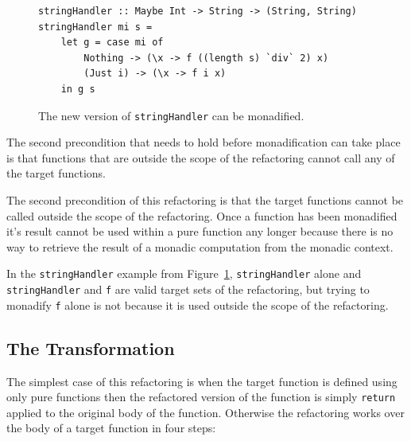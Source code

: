 \begin{figure}[t]
\begin{lstlisting}
stringHandler :: Maybe Int -> String -> (String, String)
stringHandler mi s = 
	let g = case mi of
		Nothing -> (\x -> f ((length s) `div` 2) x)
		(Just i) -> (\x -> f i x)
	in g s
\end{lstlisting}
\caption{The new version of \texttt{stringHandler} can be monadified.}
\label{etaHan}
\end{figure}

The second precondition that needs to hold before monadification can take place is that functions that are outside the scope of the refactoring cannot call any of the target functions.

The second precondition of this refactoring is that the target functions cannot be called outside the scope of the refactoring. Once a function has been monadified it's result cannot be used within a pure function any longer because there is no way to retrieve the result of a monadic computation from the monadic context.

 In the \texttt{stringHandler} example from Figure~\ref{etaHan}, \texttt{stringHandler} alone and \texttt{stringHandler} and \texttt{f} are valid target sets of the refactoring, but trying to monadify \texttt{f} alone is not because it is used outside the scope of the refactoring. 

\subsection{The Transformation}

The simplest case of this refactoring is when the target function is defined using only pure functions then the refactored version of the function is simply \texttt{return} applied to the original body of the function. Otherwise the refactoring works over the body of a target function in four steps:

